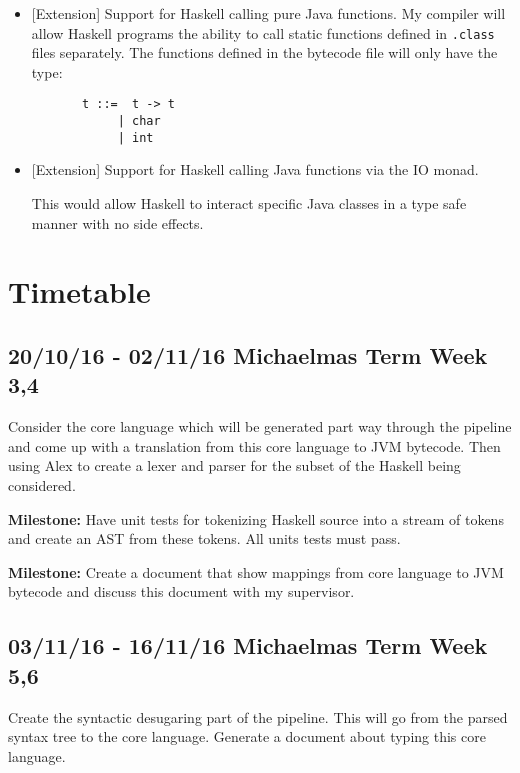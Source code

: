 \documentclass[a4paper]{article}
\begin{document}
\begin{itemize}
    \item

      [Extension] Support for Haskell calling pure Java functions.
      My compiler will allow Haskell programs the ability to call static functions defined in \texttt{.class} files separately. 
      The functions defined in the bytecode file will only have the type:
      
      \begin{verbatim}
       t ::=  t -> t
            | char 
            | int
      \end{verbatim}

    \item

      [Extension] Support for Haskell calling Java functions via the IO monad.

      This would allow Haskell to interact specific Java classes in a type safe manner with no side effects.

  \end{itemize}

  \section*{Timetable}


    \subsection*{20/10/16 - 02/11/16 \hfill Michaelmas Term Week 3,4}

      Consider the core language which will be generated part way through the pipeline and come up with
      a translation from this core language to JVM bytecode.
      Then using Alex to create a lexer and parser for the subset of the Haskell being considered.


      \textbf{Milestone:} Have unit tests for tokenizing Haskell source into a stream of tokens and create an AST from these tokens. All units tests must pass.

      \textbf{Milestone:}
      Create a document that show mappings from core language to JVM bytecode and discuss this document with my supervisor.


    \subsection*{03/11/16 - 16/11/16 \hfill Michaelmas Term Week 5,6}


      Create the syntactic desugaring part of the pipeline. This will go from the parsed syntax tree to the core language.
      Generate a document about typing this core language.
     
\end{document}
